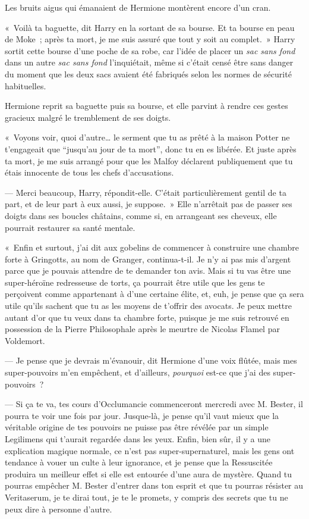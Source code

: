 Les bruits aigus qui émanaient de Hermione montèrent encore d'un cran.

«~Voilà ta baguette, dit Harry en la sortant de sa bourse.
Et ta bourse en peau de Moke~; après ta mort, je me suis assuré que tout y soit au complet.~»
Harry sortit cette bourse d'une poche de sa robe, car l'idée de placer un \emph{sac sans fond} dans un autre \emph{sac sans fond} l'inquiétait, même si c'était censé être sans danger du moment que les deux sacs avaient été fabriqués selon les normes de sécurité habituelles.

Hermione reprit sa baguette puis sa bourse, et elle parvint à rendre ces gestes gracieux malgré le tremblement de ses doigts.

«~Voyons voir, quoi d'autre… le serment que tu as prêté à la maison Potter ne t'engageait que “jusqu'au jour de ta mort”, donc tu en es libérée.
Et juste après ta mort, je me suis arrangé pour que les Malfoy déclarent publiquement que tu étais innocente de tous les chefs d'accusations.

--- Merci beaucoup, Harry, répondit-elle.
C'était particulièrement gentil de ta part, et de leur part à eux aussi, je suppose.~»
Elle n'arrêtait pas de passer ses doigts dans ses boucles châtains, comme si, en arrangeant ses cheveux, elle pourrait restaurer sa santé mentale.

«~Enfin et surtout, j'ai dit aux gobelins de commencer à construire une chambre forte à Gringotts, au nom de Granger, continua-t-il.
Je n'y ai pas mis d'argent parce que je pouvais attendre de te demander ton avis.
Mais si tu vas être une super-héroïne redresseuse de torts, ça pourrait être utile que les gens te perçoivent comme appartenant à d'une certaine élite, et, euh, je pense que ça sera utile qu'ils sachent que tu as les moyens de t'offrir des avocats.
Je peux mettre autant d'or que tu veux dans ta chambre forte, puisque je me suis retrouvé en possession de la Pierre Philosophale après le meurtre de Nicolas Flamel par Voldemort.

--- Je pense que je devrais m'évanouir, dit Hermione d'une voix flûtée, mais mes super-pouvoirs m'en empêchent, et d'ailleurs, \emph{pourquoi} est-ce que j'ai des super-pouvoirs~?

--- Si ça te va, tes cours d'Occlumancie commenceront mercredi avec M. Bester, il pourra te voir une fois par jour.
Jusque-là, je pense qu'il vaut mieux que la véritable origine de tes pouvoirs ne puisse pas être révélée par un simple Legilimens qui t'aurait regardée dans les yeux.
Enfin, bien sûr, il y a une explication magique normale, ce n'est pas super-supernaturel, mais les gens ont tendance à vouer un culte à leur ignorance, et je pense que la Ressuscitée produira un meilleur effet si elle est entourée d'une aura de mystère.
Quand tu pourras empêcher M. Bester d'entrer dans ton esprit et que tu pourras résister au Veritaserum, je te dirai tout, je te le promets, y compris des secrets que tu ne peux dire à personne d'autre.

